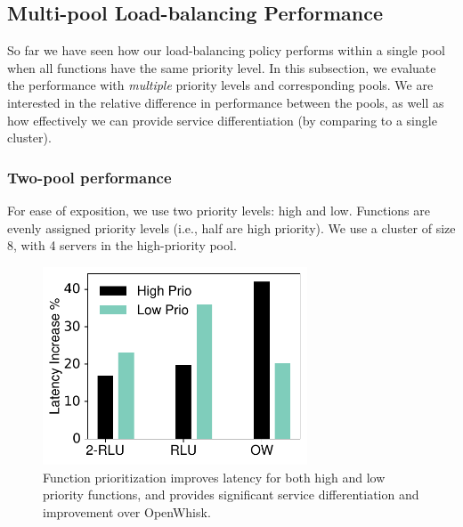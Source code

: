 \subsection{Multi-pool Load-balancing Performance}
\label{subsec:eval-multipool}
So far we have seen how our load-balancing policy performs within a single pool when all functions have the same priority level.
In this subsection, we evaluate the performance with \emph{multiple} priority levels and corresponding pools.
We are interested in the relative difference in performance between the pools, as well as how effectively we can provide service differentiation (by comparing to a single cluster).

\subsubsection{Two-pool performance}
For ease of exposition, we use two priority levels: high and low.
Functions are evenly assigned priority levels (i.e., half are high priority).
We use a cluster of size 8, with 4 servers in the high-priority pool. 


\begin{figure}
  \centering  \includegraphics[width=0.7\textwidth]{chrlu/qos/Figures/fixed/qos1.pdf} %
  \caption{Function prioritization improves latency for both high and low priority functions, and provides significant service differentiation and improvement over OpenWhisk.}
  \label{fig:qos:fixed-lat}
\end{figure}

